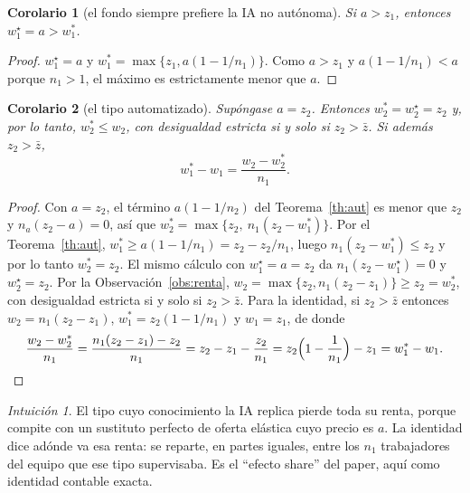 \documentclass[11pt]{article}
\theoremstyle{plain}
\newtheorem{corolario}{Corolario}
\theoremstyle{definition}
\theoremstyle{remark}
\newtheorem*{intuicion}{Intuición}
\newcommand{\ai}{a}
\begin{document}
\begin{corolario}[el fondo siempre prefiere la IA no autónoma]\label{cor:prefiere}
Si $\ai>z_1$, entonces $w_1^{\star}=\ai>w_1^{*}$.
\end{corolario}
\begin{proof}
$w_1^{\star}=\ai$ y $w_1^{*}=\max\{z_1,\ai(1-1/n_1)\}$. Como $\ai>z_1$ y $\ai(1-1/n_1)<\ai$ porque
$n_1>1$, el máximo es estrictamente menor que $\ai$.
\end{proof}

\begin{corolario}[el tipo automatizado]\label{cor:automatizado}
Supóngase $\ai=z_2$. Entonces $w_2^{*}=w_2^{\star}=z_2$ y, por lo tanto, $w_2^{*}\le w_2$, con
desigualdad estricta si y solo si $z_2>\bar z$. Si además $z_2>\bar z$,
\[
  w_1^{*}-w_1=\frac{w_2-w_2^{*}}{n_1}.
\]
\end{corolario}
\begin{proof}
Con $\ai=z_2$, el término $\ai(1-1/n_2)$ del Teorema~\ref{th:aut} es menor que $z_2$ y
$n_a(z_2-\ai)=0$, así que $w_2^{*}=\max\{z_2,\ n_1(z_2-w_1^{*})\}$. Por el Teorema~\ref{th:aut},
$w_1^{*}\ge \ai(1-1/n_1)=z_2-z_2/n_1$, luego $n_1(z_2-w_1^{*})\le z_2$ y por lo tanto $w_2^{*}=z_2$.
El mismo cálculo con $w_1^{\star}=\ai=z_2$ da $n_1(z_2-w_1^{\star})=0$ y $w_2^{\star}=z_2$. Por la
Observación~\ref{obs:renta}, $w_2=\max\{z_2,n_1(z_2-z_1)\}\ge z_2=w_2^{*}$, con desigualdad estricta
si y solo si $z_2>\bar z$. Para la identidad, si $z_2>\bar z$ entonces $w_2=n_1(z_2-z_1)$,
$w_1^{*}=z_2(1-1/n_1)$ y $w_1=z_1$, de donde
\[
  \frac{w_2-w_2^{*}}{n_1}=\frac{n_1(z_2-z_1)-z_2}{n_1}=z_2-z_1-\frac{z_2}{n_1}
  =z_2\Big(1-\frac{1}{n_1}\Big)-z_1=w_1^{*}-w_1. \qedhere
\]
\end{proof}

\begin{intuicion}
El tipo cuyo conocimiento la IA replica pierde toda su renta, porque compite con un sustituto perfecto
de oferta elástica cuyo precio es $\ai$. La identidad dice adónde va esa renta: se reparte, en partes
iguales, entre los $n_1$ trabajadores del equipo que ese tipo supervisaba. Es el ``efecto share'' del
paper, aquí como identidad contable exacta.
\end{intuicion}
\end{document}
